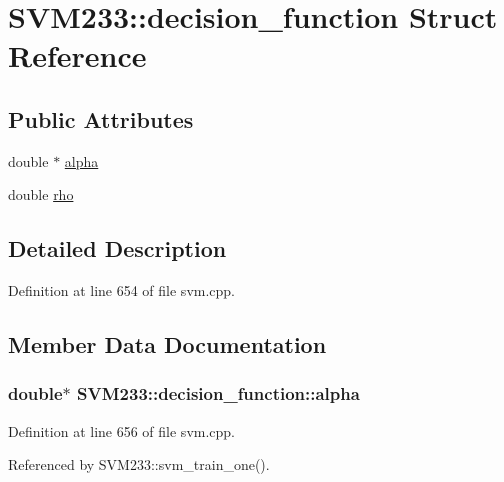 \hypertarget{struct_s_v_m233_1_1decision__function}{}\section{S\+V\+M233\+:\+:decision\+\_\+function Struct Reference}
\label{struct_s_v_m233_1_1decision__function}
\subsection*{Public Attributes}
\begin{DoxyCompactItemize}
\item 
double $\ast$ \hyperlink{struct_s_v_m233_1_1decision__function_a86381f66c8c44e5c079ed409a674d852}{alpha}
\item 
double \hyperlink{struct_s_v_m233_1_1decision__function_a00836384c2f15ce44ec0802a82cd6b8f}{rho}
\end{DoxyCompactItemize}


\subsection{Detailed Description}


Definition at line 654 of file svm.\+cpp.



\subsection{Member Data Documentation}
\subsubsection[{\texorpdfstring{alpha}{alpha}}]{\setlength{\rightskip}{0pt plus 5cm}double$\ast$ S\+V\+M233\+::decision\+\_\+function\+::alpha}\hypertarget{struct_s_v_m233_1_1decision__function_a86381f66c8c44e5c079ed409a674d852}{}\label{struct_s_v_m233_1_1decision__function_a86381f66c8c44e5c079ed409a674d852}


Definition at line 656 of file svm.\+cpp.



Referenced by S\+V\+M233\+::svm\+\_\+train\+\_\+one().

